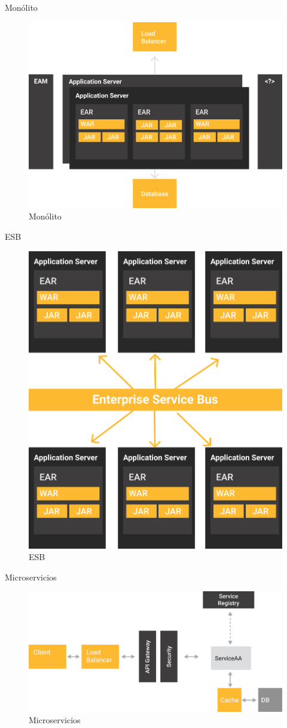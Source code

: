 \documentclass{beamer}
\begin{document}
\begin{frame}{Monólito}
\begin{figure}
	\centering
	\includegraphics[width=0.7\linewidth]{Images/monolitos}
	\caption{Monólito}
\end{figure}
\end{frame}

\begin{frame}{ESB}
\begin{figure}
	\centering
	\includegraphics[width=0.5\linewidth]{Images/esb}
	\caption{ESB}
\end{figure}
\end{frame}

\begin{frame}{Microservicios}
\begin{figure}
\centering
\includegraphics[width=\linewidth]{Images/microservicios}
\caption{Microservicios}
\end{figure}
\end{frame}
\end{document}
